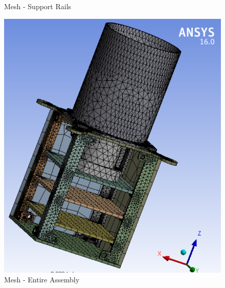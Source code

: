 \documentclass[../../main.tex]{subfiles}
\begin{document}
\begin{enumerate}
\begin{enumerate}
\begin{enumerate}
\begin{figure}[H]
                    \caption{Mesh - Support Rails}
                    \label{fig:sys_CAD}
                \end{figure}
                \begin{figure}[H]
                    \centering
                    \includegraphics[scale=0.6]{Figures/Mechanical/Entire_STADS_Mesh.PNG}
                    \caption{Mesh - Entire Assembly}
                    \label{fig:sys_CAD}
                \end{figure}
                

\end{enumerate}
\end{enumerate}
\end{enumerate}
\end{document}
